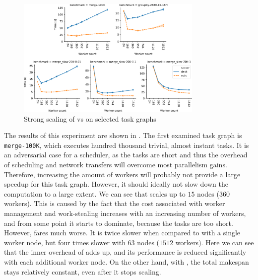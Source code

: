 \begin{figure}[h]
	\centering
	\includegraphics[width=0.8\textwidth]{./imgs/rsds/charts/rsds-dask-scaling}
	\caption{Strong scaling of \rsds{} vs \dask{} on selected task graphs}
	\label{fig:rsds-dask-scaling}
\end{figure}

The results of this experiment are shown in . The first examined task
graph is \texttt{merge-100K}, which executes hundred thousand trivial, almost instant
tasks. It is an adversarial case for a scheduler, as the tasks are short and thus the overhead of
scheduling and network transfers will overcome most parallelism gains. Therefore, increasing the
amount of workers will probably not provide a large speedup for this task graph. However, it should
ideally not slow down the computation to a large extent. We can see that
\rsds{} scales up to $15$ nodes
($360$ workers). This is caused by the fact that the cost associated with
worker management and work-stealing increases with an increasing number of workers, and from some
point it starts to dominate, because the tasks are too short. However, \dask{}
fares much worse. It is twice slower when compared to \rsds{} with a single
worker node, but four times slower with $63$ nodes
($1512$ workers). Here we can see that the inner overhead of
\dask{} adds up, and its performance is reduced significantly with each
additional worker node. On the other hand, with \rsds{}, the total makespan
stays relatively constant, even after it stops scaling.

